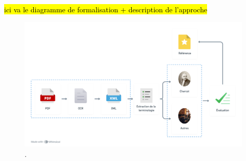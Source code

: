 \hl{ici va le diagramme de formalisation + description de l'approche}

\begin{figure}[!ht]
	\centering
	\includegraphics[width=1\textwidth]{img/formalisation_approche.png}
	\caption{.}
	\label{fig:formalisation}
\end{figure}
